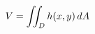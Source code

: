 \documentclass[preview]{standalone}
\begin{document}
\begin{align*}
\special{dvisvgm:raw <g id='unique000'>}V=\iint_D h(x,y)\,dA\special{dvisvgm:raw </g>}
\end{align*}
\end{document}
